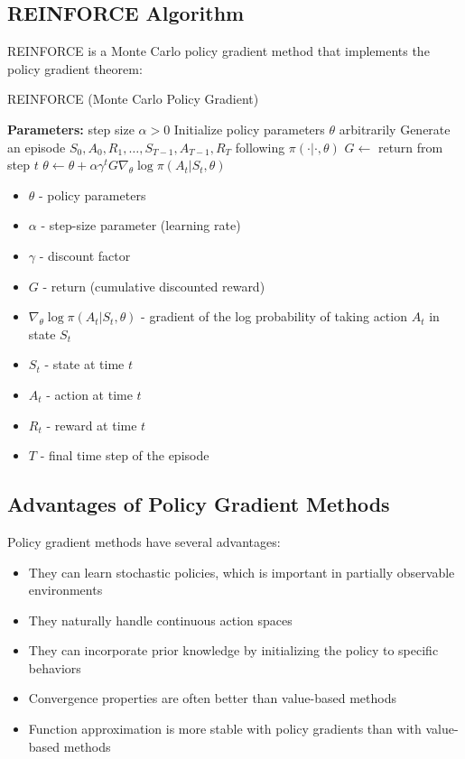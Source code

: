 \documentclass[11pt,a4paper]{article}
\begin{document}
\subsection{REINFORCE Algorithm}

REINFORCE is a Monte Carlo policy gradient method that implements the policy gradient theorem:

\begin{algorithm}[H]
\caption{REINFORCE (Monte Carlo Policy Gradient)}
\begin{algorithmic}[1]
\State \textbf{Parameters:} step size $\alpha > 0$
\State Initialize policy parameters $\theta$ arbitrarily
    \State Generate an episode $S_0, A_0, R_1, \ldots, S_{T-1}, A_{T-1}, R_T$ following $\pi(·|·, \theta)$
        \State $G \gets$ return from step $t$
        \State $\theta \gets \theta + \alpha \gamma^t G \nabla_\theta \log \pi(A_t|S_t, \theta)$
    \EndFor
\EndFor
\end{algorithmic}
\end{algorithm}

\begin{tcolorbox}[title=Notation Overview]
\begin{itemize}
    \item $\theta$ - policy parameters
    \item $\alpha$ - step-size parameter (learning rate)
    \item $\gamma$ - discount factor
    \item $G$ - return (cumulative discounted reward)
    \item $\nabla_\theta \log \pi(A_t|S_t, \theta)$ - gradient of the log probability of taking action $A_t$ in state $S_t$
    \item $S_t$ - state at time $t$
    \item $A_t$ - action at time $t$
    \item $R_t$ - reward at time $t$
    \item $T$ - final time step of the episode
\end{itemize}
\end{tcolorbox}

\subsection{Advantages of Policy Gradient Methods}

Policy gradient methods have several advantages:

\begin{itemize}
    \item They can learn stochastic policies, which is important in partially observable environments
    \item They naturally handle continuous action spaces
    \item They can incorporate prior knowledge by initializing the policy to specific behaviors
    \item Convergence properties are often better than value-based methods
    \item Function approximation is more stable with policy gradients than with value-based methods
\end{itemize}
\end{document}
